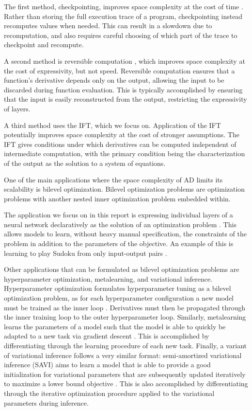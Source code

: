 \documentclass[11pt]{article}
\begin{document}
The first method, checkpointing, improves space complexity at the cost of time \citep{griewank2008autodiff}.
Rather than storing the full execution trace of a program,
checkpointing instead recomputes values when needed.
This can result in a slowdown due to recomputation,
and also requires careful choosing of which part of the trace to checkpoint and recompute.

A second method is reversible computation \citep{maclaurin2015reversible,gomez2017reversible},
which improves space complexity at the cost of expressivity, but not speed.
Reversible computation ensures that a function's derivative depends only on the output,
allowing the input to be discarded during function evaluation.
This is typically accomplished by ensuring that the input is easily reconstructed from the output,
restricting the expressivity of layers.

A third method uses the IFT, which we focus on.
Application of the IFT potentially improves space complexity at the cost of stronger assumptions.
The IFT gives conditions under which derivatives can be computed independent of
intermediate computation,
with the primary condition being the characterization of the output as the solution
to a system of equations.

One of the main applications where the space complexity of AD limits its scalability
is bilevel optimization.
Bilevel optimization problems are
optimization problems with another nested inner optimization problem embedded within.

The application we focus on in this report is expressing individual layers of a neural network declaratively
as the solution of an optimization problem \citep{optnet,agrawal2019diffcvx,gould2019declarative}.
This allows models to learn, without heavy manual specification, the constraints of the problem
in addition to the parameters of the objective.
An example of this is learning to play Sudoku from only input-output pairs \citep{optnet}.

Other applications that can be formulated as bilevel optimization problems are
hyperparameter optimization, metalearning, and variational inference.
Hyperparameter optimization formulates hyperparameter tuning as a bilevel optimization problem,
as for each hyperparameter configuration a new model must be trained as the inner loop
\citep{maclaurin2015reversible,lorraine2019implasso,lorraine2019hoift,bertrand2020implicit}.
Derivatives must then be propagated through the inner training loop to the outer hyperparameter
loop.
Similarly, metalearning learns the parameters of a model such that the model is able to quickly
be adapted to a new task via gradient descent \citep{finn2017maml,rajeswaran2019imaml}.
This is accomplished by differentiating through the learning procedure of each new task.
Finally, a variant of variational inference follows a very similar format:
semi-amortized variational inference (SAVI) aims to learn a model that is able to provide
a good initialization for variational parameters that are subsequently updated iteratively
to maximize a lower bound objective \citep{kim2018savi}.
This is also accomplished by differentiating through the iterative optimization procedure
applied to the variational parameters during inference.
\end{document}
